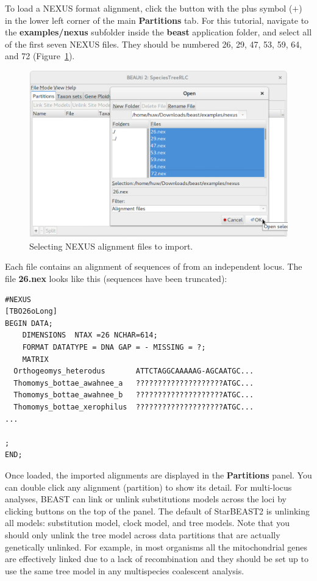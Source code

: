 \documentclass{article}
\begin{document}
To load a NEXUS format alignment, click the button with the plus symbol ($+$) in
the lower left corner of the main \textbf{Partitions} tab. For this tutorial,
navigate to the \textbf{examples/nexus} subfolder inside the \textbf{beast}
application folder, and select all of the first seven NEXUS files. They should
be numbered 26, 29, 47, 53, 59, 64, and 72 (Figure~\ref{fig:importAlignments}).

\begin{figure}[htb!]
\centering
\includegraphics[width=\textwidth]{figures/beauti-import.png}
\caption{Selecting NEXUS alignment files to import.}
\label{fig:importAlignments}
\end{figure}

\clearpage

Each file contains an alignment of sequences of from an independent locus. The
file \textbf{26.nex} looks like this (sequences have been truncated):

\begin{minipage}[h]{0.7\textwidth}
\begin{verbatim}
#NEXUS
[TBO26oLong]
BEGIN DATA;
	DIMENSIONS  NTAX =26 NCHAR=614;
	FORMAT DATATYPE = DNA GAP = - MISSING = ?;
	MATRIX	
  Orthogeomys_heterodus       ATTCTAGGCAAAAAG-AGCAATGC...
  Thomomys_bottae_awahnee_a   ????????????????????ATGC...
  Thomomys_bottae_awahnee_b   ????????????????????ATGC...
  Thomomys_bottae_xerophilus  ????????????????????ATGC...
...

;
END;
\end{verbatim}
\end{minipage}

\vspace{12pt}

Once loaded, the imported alignments are displayed in the \textbf{Partitions}
panel. You can double click any alignment (partition) to show its detail. For
multi-locus analyses, BEAST can link or unlink substitutions models across the
loci by clicking buttons on the top of the panel. The default of StarBEAST2 is
unlinking all models: substitution model, clock model, and tree models. Note
that you should only unlink the tree model across data partitions that are
actually genetically unlinked. For example, in most organisms all the
mitochondrial genes are effectively linked due to a lack of recombination and
they should be set up to use the same tree model in any multispecies coalescent
analysis.
\end{document}
